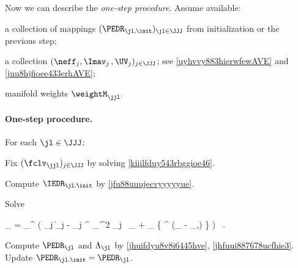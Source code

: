 Now we can describe the \emph{one-step procedure}. 
Assume available:
%
\begin{mylist}
	\item 
	a collection of mappings \( (\PEDR_{\jl,\init})_{\jl \in \JJJ} \) from 
	initialization or the previous step;

	\item 
	a collection \( (\neff_{j}, \Imav_{j} \, , \UV_{j})_{j \in \JJJ} \); 
	see \eqref{uyhvvy883hierwfewAVE} and \eqref{juu8hjfioee433erhAVE};

	\item 
 	manifold weights \( \weightM_{\jjl} \).
\end{mylist}
%
\paragraph{One-step procedure.}
For each \( \jl \in \JJJ \):
%
\begin{mylist}
	\item
	Fix \( (\fclv_{\jjl})_{j \in \JJJ} \) by solving \eqref{kiiilfduy543rbggioe46}.
%
	\item
	Compute \( \IEDR_{\jl,\init} \) by \eqref{jfu88uuujecvyyyyyue}.
%
	\item
	Solve
\begin{EQA}[c]
	\BEDR_{\jl}
	=
	\arginf_{\BEDR \in \R^{\dimm \times \dimd}} \biggl( \sum_{j \in \JJJ}
		\bigl\| \Imav_{j} - \UV_{j} \BEDR^{\T} \fclv_{\jjl} \bigr\|^{2} \neff_{j} \, \weightM_{\jjl}
		+ \lambda_{\subM} \tr \bigl\{ \BEDR^{\T} \BEDR (\Id_{\dimd} - \IEDR_{\jl,\init}) \bigr\} 
	\biggr)
	\, .
	\qquad
\end{EQA}
%
	\item
	Compute \( \PEDR_{\jl} \) and \( \Lambda_{\jl} \) by  \eqref{jhuifdyu8v8i6445hve}, \eqref{jhfuui887678ucfhie3}.
	Update \( \PEDR_{\jl,\init} = \PEDR_{\jl} \).

\end{mylist}

